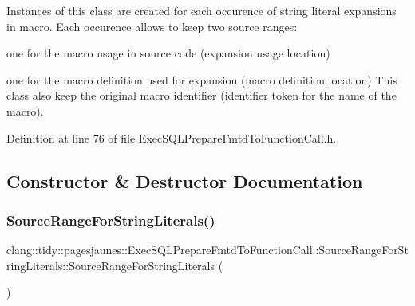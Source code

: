 Instances of this class are created for each occurence of string literal expansions in macro. Each occurence allows to keep two source ranges\+:
\begin{DoxyItemize}
\item one for the macro usage in source code (expansion usage location)
\item one for the macro definition used for expansion (macro definition location) This class also keep the original macro identifier (identifier token for the name of the macro). 
\end{DoxyItemize}

Definition at line 76 of file Exec\+S\+Q\+L\+Prepare\+Fmtd\+To\+Function\+Call.\+h.



\subsection{Constructor \& Destructor Documentation}
\mbox{\label{classclang_1_1tidy_1_1pagesjaunes_1_1_exec_s_q_l_prepare_fmtd_to_function_call_1_1_source_range_for_string_literals_aec017f348974b51122f7f249824f713a}} 
\subsubsection{\texorpdfstring{Source\+Range\+For\+String\+Literals()}{SourceRangeForStringLiterals()}\hspace{0.1cm}{\footnotesize\ttfamily [1/6]}}
{\footnotesize\ttfamily clang\+::tidy\+::pagesjaunes\+::\+Exec\+S\+Q\+L\+Prepare\+Fmtd\+To\+Function\+Call\+::\+Source\+Range\+For\+String\+Literals\+::\+Source\+Range\+For\+String\+Literals (\begin{DoxyParamCaption}{ }\end{DoxyParamCaption})\hspace{0.3cm}{\ttfamily [inline]}}



